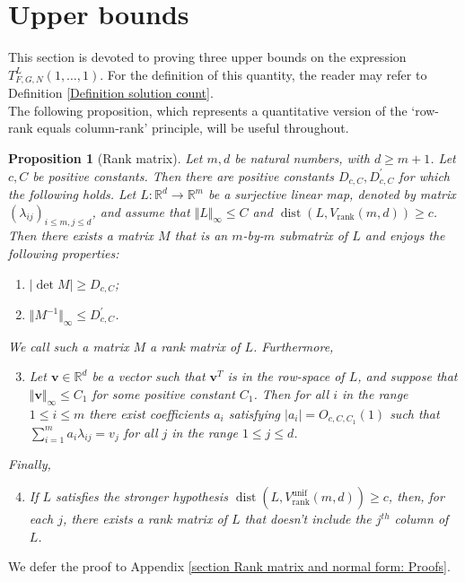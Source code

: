 \documentclass[12pt,a4paper,twoside,reqno]{amsart}
\newtheorem{Proposition}[Theorem]{Proposition}
\newcommand{\rank}{\operatorname{rank}}
\newcommand{\dist}{\operatorname{dist}}
\newcommand{\unif}{\operatorname{unif}}
\numberwithin{equation}{section}
\begin{document}
\section{Upper bounds}
\label{section upper bounds}
This section is devoted to proving three upper bounds on the expression\\ $T_{F,G,N}^L(1,\dots,1)$. For the definition of this quantity, the reader may refer to Definition \ref{Definition solution count}. \\

The following proposition, which represents a quantitative version of the `row-rank equals column-rank' principle, will be useful throughout.

\begin{Proposition}[Rank matrix]
\label{rank matrix}
Let $m,d$ be natural numbers, with $d\geqslant m+1$. Let $c,C$ be positive constants. Then there are positive constants $D_{c,C}, D^\prime_{c,C}$ for which the following holds. Let $L:\mathbb{R}^d\longrightarrow \mathbb{R}^m$ be a surjective linear map, denoted by matrix $(\lambda_{ij})_{i\leqslant m,j\leqslant d}$, and assume that $\Vert L\Vert_\infty \leqslant C$ and $\dist(L,V_{\rank}(m,d)) \geqslant c$. Then there exists a matrix $M$ that is an $m$-by-$m$ submatrix of $L$ and enjoys the following properties:
\begin{enumerate}[(1)]
\item  $\vert\operatorname{det}M\vert \geqslant D_{c,C}$; \\
\item $\Vert M^{-1}\Vert_{\infty} \leqslant D^\prime_{c,C}$.\\
\end{enumerate}
\noindent We call such a matrix $M$ a \emph{rank matrix} of $L$. Furthermore,\\
\begin{enumerate}[(1)]
\setcounter{enumi}{2}
\item Let $\mathbf{v}\in \mathbb{R}^d$ be a vector such that $\mathbf{v}^T$ is in the row-space of $L$, and suppose that $\Vert \mathbf{v}\Vert_\infty \leqslant C_1$ for some positive constant $C_1$. Then for all $i$ in the range $1\leqslant i\leqslant m$ there exist coefficients $a_i$ satisfying $\vert a_i\vert = O_{c,C,C_1}(1)$ such that $\sum\limits_{i=1}^m a_i \lambda_{ij} = v_{j}$ for all $j$ in the range $1\leqslant j\leqslant d$. \\
\end{enumerate}
Finally,\\
\begin{enumerate}
\setcounter{enumi}{3}
\item If $L$ satisfies the stronger hypothesis $\dist(L,V_{\rank}^{\unif}(m,d))\geqslant c$, then, for each $j$, there exists a rank matrix of $L$ that doesn't include the $j^{th}$ column of $L$.
\end{enumerate}
\end{Proposition}
\noindent We defer the proof to Appendix \ref{section Rank matrix and normal form: Proofs}.\\
\end{document}
